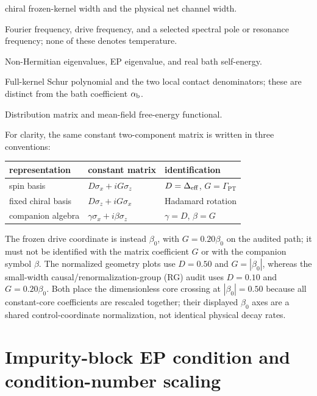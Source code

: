 \documentclass[%
  aps,prb,reprint,amsmath,amssymb,superscriptaddress,longbibliography,floatfix
]{revtex4-2}
\newcommand{\Gpt}{\Gamma_{\mathrm{PT}}}   %
\newcommand{\Deff}{\Delta_{\rm eff}}     %
\begin{document}
\begin{description}[leftmargin=1.6cm,style=nextline]
chiral frozen-kernel width and the physical net channel width.
\item[$\omega,\Omega,\omega_0$]
Fourier frequency, drive frequency, and a selected spectral pole or resonance frequency; none of these denotes temperature.
\item[$\mathcal E_n,E_{\rm EP},\Lambda(\omega)$]
Non-Hermitian eigenvalues, EP eigenvalue, and real bath self-energy.
\item[$\mathcal P,\mathfrak a,\mathfrak b$]
Full-kernel Schur polynomial and the two local contact denominators; these are distinct from the bath coefficient $\alpha_{\rm b}$.
\item[$\mathcal F_{\rm dist},\mathcal F_{\rm MF}$]
Distribution matrix and mean-field free-energy functional.
\end{description}

For clarity, the same constant two-component matrix is written in three
conventions:
\begin{center}
\begin{tabular}{@{}lll@{}}
\toprule
representation & constant matrix & identification \\
\midrule
spin basis & $D\sigma_x+iG\sigma_z$ & $D=\Deff$, $G=\Gpt$ \\
fixed chiral basis & $D\sigma_z+iG\sigma_x$ & Hadamard rotation \\
companion algebra & $\gamma\sigma_x+i\beta\sigma_z$ & $\gamma=D$, $\beta=G$ \\
\bottomrule
\end{tabular}
\end{center}
The frozen drive coordinate is instead $\beta_0$, with
$G=0.20\beta_0$ on the audited path; it must not be identified with the
matrix coefficient $G$ or with the companion symbol $\beta$.
The normalized geometry plots use $D=0.50$ and $G=|\beta_0|$, whereas the
small-width causal/renormalization-group (RG) audit uses $D=0.10$ and
$G=0.20\beta_0$.  Both place
the dimensionless core crossing at $|\beta_0|=0.50$ because all constant-core
coefficients are rescaled together; their displayed $\beta_0$ axes are a
shared control-coordinate normalization, not identical physical decay rates.

\appendix


\section{Impurity-block EP condition and condition-number scaling}
\label{app:harmonic}
\label{app:EP_scaling}
\end{document}
